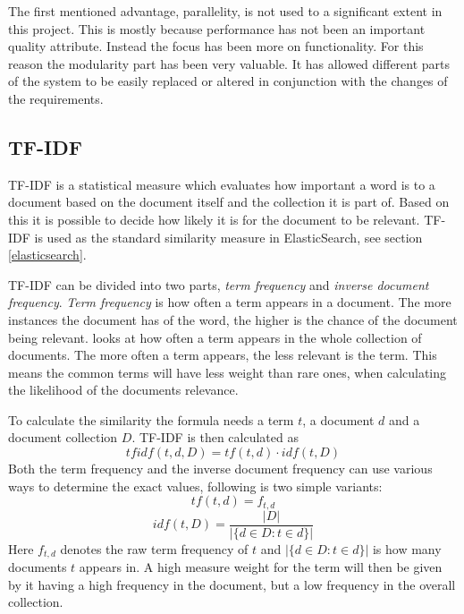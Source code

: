 The first mentioned advantage, parallelity, is not used to a significant extent in this project. This is mostly because performance has not been an important quality attribute. Instead the focus has been more on functionality. For this reason the modularity part has been very valuable. It has allowed different parts of the system to be easily replaced or altered in conjunction with the changes of the requirements.


\subsection{TF-IDF} \label{tf/idf}
TF-IDF is a statistical measure which evaluates how important a word is to a document based on the document itself and the collection it is part of. Based on this it is possible to decide how likely it is for the document to be relevant. TF-IDF is used as the standard similarity measure in ElasticSearch, see section \ref{elasticsearch}.

TF-IDF can be divided into two parts, \textit{term frequency} and \textit{inverse document frequency}. \textit{Term frequency} is how often a term appears in a document. The more instances the document has of the word, the higher is the chance of the document being relevant.  looks at how often a term appears in the whole collection of documents. The more often a term appears, the less relevant is the term. This means the common terms will have less weight than rare ones, when calculating the likelihood of the documents relevance.

To calculate the similarity the formula needs a term \(t\), a document \(d\) and a document collection \(D\). TF-IDF is then calculated as
\[tfidf(t, d, D) = tf(t, d)  \cdot idf(t, D)\]
Both the term frequency and the inverse document frequency can use various ways to determine the exact values, following is two simple variants: 
\[tf(t, d) = f_{t,d}\] 
\[idf(t, D) = \frac{|D|}{ |\{d \in D: t \in d\}| }\]
Here \(f_{t,d}\) denotes the raw term frequency of \(t\) and \( |\{d \in D: t \in d\}| \) is how many documents \(t\) appears in. A high measure weight for the term will then be given by it having a high frequency in the document, but a low frequency in the overall collection.



\cleardoublepage